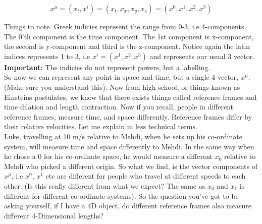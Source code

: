\begin{equation}
  x^\mu = (x_t, x^i) = (x_t, x_x, x_y, x_z) = (x^0, x^1, x^2, x^3)
\end{equation}

Things to note. Greek indicies represent the range from 0-3, i.e 4-components. The 0'th component is the time component. The 1st component is x-component, the second is y-component and third is the z-component. Notice again the latin indices represents 1 to 3, i.e $x^i = (x^1, x^2, x^3)$ and represents our usual 3 vector. \textbf{Important:} The indicies do not represent powers, but a labelling. \\

So now we can represent any point in space and time, but a single 4-vector, $x^{\mu}$. (Make sure you understand this). Now from high-school, or things known as Einsteins postulates, we know that there exists things called reference frames and time dilation and length contraction. Now if you recall, people in different reference frames, measure time, and space differently. Reference frames differ by their relative velocities. Let me explain in less technical terms. \\

Luke, travelling at 10 m/s relative to Mehdi, when he sets up his co-ordinate system, will measure time and space differently to Mehdi. In the same way when he chose a 0 for his co-ordinate space, he would measure a different $x_0$ relative to Mehdi who picked a different origin. So what we find, is the vector components of $x^\mu$, i.e $x^0$, $x^1$ etc are different for people who travel at different speeds to each other. (Is this really different from what we expect? The same as $x_0$ and $x_1$ is different for different co-ordinate systems). So the question you've got to be asking yourself, if I have a 4D object, do different reference frames also measure different 4-Dimensional lengths?


